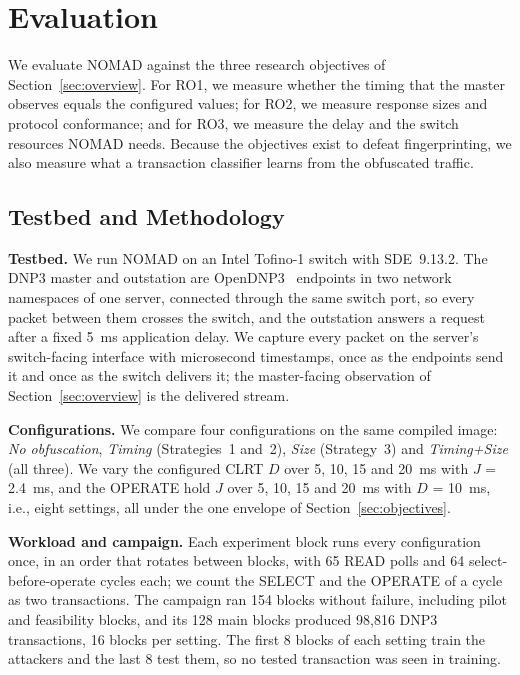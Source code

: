 \section{Evaluation}
\label{sec:evaluation}

We evaluate NOMAD against the three research objectives of Section~\ref{sec:overview}. For RO1, we measure whether the timing that the master observes equals the configured values; for RO2, we measure response sizes and protocol conformance; and for RO3, we measure the delay and the switch resources NOMAD needs. Because the objectives exist to defeat fingerprinting, we also measure what a transaction classifier learns from the obfuscated traffic.

\subsection{Testbed and Methodology}

\textbf{Testbed.} We run NOMAD on an Intel Tofino-1 switch with SDE~9.13.2. The DNP3 master and outstation are OpenDNP3~\cite{opendnp3} endpoints in two network namespaces of one server, connected through the same switch port, so every packet between them crosses the switch, and the outstation answers a request after a fixed 5~ms application delay. We capture every packet on the server's switch-facing interface with microsecond timestamps, once as the endpoints send it and once as the switch delivers it; the master-facing observation of Section~\ref{sec:overview} is the delivered stream.

\textbf{Configurations.} We compare four configurations on the same compiled image: \emph{No obfuscation}, \emph{Timing} (Strategies~1 and~2), \emph{Size} (Strategy~3) and \emph{Timing+Size} (all three). We vary the configured CLRT $D$ over 5, 10, 15 and 20~ms with $J$ = 2.4~ms, and the OPERATE hold $J$ over 5, 10, 15 and 20~ms with $D$ = 10~ms, i.e., eight settings, all under the one envelope of Section~\ref{sec:objectives}.

\textbf{Workload and campaign.} Each experiment block runs every configuration once, in an order that rotates between blocks, with 65 READ polls and 64 select-before-operate cycles each; we count the SELECT and the OPERATE of a cycle as two transactions. The campaign ran 154 blocks without failure, including pilot and feasibility blocks, and its 128 main blocks produced 98,816 DNP3 transactions, 16 blocks per setting. The first 8 blocks of each setting train the attackers and the last 8 test them, so no tested transaction was seen in training.

